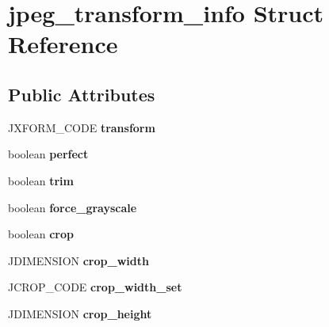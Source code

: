 \hypertarget{structjpeg__transform__info}{\section{jpeg\-\_\-transform\-\_\-info Struct Reference}
\label{structjpeg__transform__info}
}
\subsection*{Public Attributes}
\begin{DoxyCompactItemize}
\item 
\hypertarget{structjpeg__transform__info_aa3227394d9b01bae8543faf79e9c5fe8}{J\-X\-F\-O\-R\-M\-\_\-\-C\-O\-D\-E {\bfseries transform}}\label{structjpeg__transform__info_aa3227394d9b01bae8543faf79e9c5fe8}

\item 
\hypertarget{structjpeg__transform__info_a6cefe762b48d689b0b805dd5c3be75fd}{boolean {\bfseries perfect}}\label{structjpeg__transform__info_a6cefe762b48d689b0b805dd5c3be75fd}

\item 
\hypertarget{structjpeg__transform__info_a4f1f979322463d2c02a307047f0cf6b7}{boolean {\bfseries trim}}\label{structjpeg__transform__info_a4f1f979322463d2c02a307047f0cf6b7}

\item 
\hypertarget{structjpeg__transform__info_a26d925edb18e0095056b38312fb86e53}{boolean {\bfseries force\-\_\-grayscale}}\label{structjpeg__transform__info_a26d925edb18e0095056b38312fb86e53}

\item 
\hypertarget{structjpeg__transform__info_a9c2edc10e30220708a48c93422841dc4}{boolean {\bfseries crop}}\label{structjpeg__transform__info_a9c2edc10e30220708a48c93422841dc4}

\item 
\hypertarget{structjpeg__transform__info_aa7669467cf9562283cfc92df23798035}{J\-D\-I\-M\-E\-N\-S\-I\-O\-N {\bfseries crop\-\_\-width}}\label{structjpeg__transform__info_aa7669467cf9562283cfc92df23798035}

\item 
\hypertarget{structjpeg__transform__info_a8f5206aab70a3ff0b0acc94cb8692b4c}{J\-C\-R\-O\-P\-\_\-\-C\-O\-D\-E {\bfseries crop\-\_\-width\-\_\-set}}\label{structjpeg__transform__info_a8f5206aab70a3ff0b0acc94cb8692b4c}

\item 
\hypertarget{structjpeg__transform__info_a0ed85b4df9f3feaeff5cf31252b0a0dd}{J\-D\-I\-M\-E\-N\-S\-I\-O\-N {\bfseries crop\-\_\-height}}\label{structjpeg__transform__info_a0ed85b4df9f3feaeff5cf31252b0a0dd}


\end{DoxyCompactItemize}
